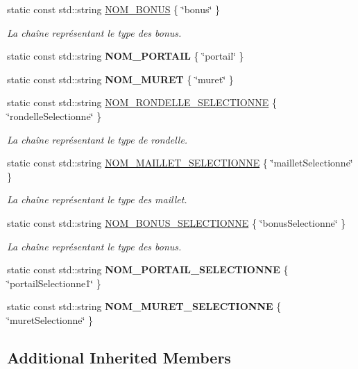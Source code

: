 \begin{DoxyCompactItemize}
static const std\+::string \hyperlink{group__inf2990_gafd57ee426cc672e15633e991ae1af778}{N\+O\+M\+\_\+\+B\+O\+N\+US} \{ \char`\"{}bonus\char`\"{} \}
\begin{DoxyCompactList}\small\item\em La chaîne représentant le type des bonus. \end{DoxyCompactList}\item 
static const std\+::string {\bfseries N\+O\+M\+\_\+\+P\+O\+R\+T\+A\+IL} \{ \char`\"{}portail\char`\"{} \}
\item 
static const std\+::string {\bfseries N\+O\+M\+\_\+\+M\+U\+R\+ET} \{ \char`\"{}muret\char`\"{} \}
\item 
static const std\+::string \hyperlink{group__inf2990_gae183e8a892519a2f49ad865915a2660d}{N\+O\+M\+\_\+\+R\+O\+N\+D\+E\+L\+L\+E\+\_\+\+S\+E\+L\+E\+C\+T\+I\+O\+N\+NE} \{ \char`\"{}rondelle\+Selectionne\char`\"{} \}
\begin{DoxyCompactList}\small\item\em La chaîne représentant le type de rondelle. \end{DoxyCompactList}\item 
static const std\+::string \hyperlink{group__inf2990_ga99be33243b1837d45f790f6a71ce4fe5}{N\+O\+M\+\_\+\+M\+A\+I\+L\+L\+E\+T\+\_\+\+S\+E\+L\+E\+C\+T\+I\+O\+N\+NE} \{ \char`\"{}maillet\+Selectionne\char`\"{} \}
\begin{DoxyCompactList}\small\item\em La chaîne représentant le type des maillet. \end{DoxyCompactList}\item 
static const std\+::string \hyperlink{group__inf2990_ga350eaa0bf18cc679099ec92c9ad833d0}{N\+O\+M\+\_\+\+B\+O\+N\+U\+S\+\_\+\+S\+E\+L\+E\+C\+T\+I\+O\+N\+NE} \{ \char`\"{}bonus\+Selectionne\char`\"{} \}
\begin{DoxyCompactList}\small\item\em La chaîne représentant le type des bonus. \end{DoxyCompactList}\item 
static const std\+::string {\bfseries N\+O\+M\+\_\+\+P\+O\+R\+T\+A\+I\+L\+\_\+\+S\+E\+L\+E\+C\+T\+I\+O\+N\+NE} \{ \char`\"{}portail\+Selectionne1\char`\"{} \}
\item 
static const std\+::string {\bfseries N\+O\+M\+\_\+\+M\+U\+R\+E\+T\+\_\+\+S\+E\+L\+E\+C\+T\+I\+O\+N\+NE} \{ \char`\"{}muret\+Selectionne\char`\"{} \}
\end{DoxyCompactItemize}
\subsection*{Additional Inherited Members}


